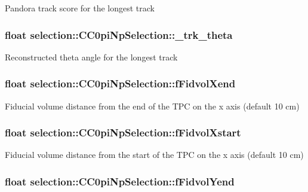 Pandora track score for the longest track \hypertarget{classselection_1_1CC0piNpSelection_a08cd38de74e9611829a3580a310c19f2}{
\subsubsection[{\-\_\-trk\-\_\-theta}]{\setlength{\rightskip}{0pt plus 5cm}float selection\-::\-C\-C0pi\-Np\-Selection\-::\-\_\-trk\-\_\-theta\hspace{0.3cm}{\ttfamily [private]}}}\label{classselection_1_1CC0piNpSelection_a08cd38de74e9611829a3580a310c19f2}
Reconstructed theta angle for the longest track \hypertarget{classselection_1_1CC0piNpSelection_a754589459e1f2d90a8ad853c68f864db}{
\subsubsection[{f\-Fidvol\-Xend}]{\setlength{\rightskip}{0pt plus 5cm}float selection\-::\-C\-C0pi\-Np\-Selection\-::f\-Fidvol\-Xend\hspace{0.3cm}{\ttfamily [private]}}}\label{classselection_1_1CC0piNpSelection_a754589459e1f2d90a8ad853c68f864db}
Fiducial volume distance from the end of the T\-P\-C on the x axis (default 10 cm) \hypertarget{classselection_1_1CC0piNpSelection_a783e7f9dcd42c083658870f7d23931da}{
\subsubsection[{f\-Fidvol\-Xstart}]{\setlength{\rightskip}{0pt plus 5cm}float selection\-::\-C\-C0pi\-Np\-Selection\-::f\-Fidvol\-Xstart\hspace{0.3cm}{\ttfamily [private]}}}\label{classselection_1_1CC0piNpSelection_a783e7f9dcd42c083658870f7d23931da}
Fiducial volume distance from the start of the T\-P\-C on the x axis (default 10 cm) \hypertarget{classselection_1_1CC0piNpSelection_a4732dc1091cb1881c741d57f999b5035}{
\subsubsection[{f\-Fidvol\-Yend}]{\setlength{\rightskip}{0pt plus 5cm}float selection\-::\-C\-C0pi\-Np\-Selection\-::f\-Fidvol\-Yend\hspace{0.3cm}{\ttfamily [private]}}}\label{classselection_1_1CC0piNpSelection_a4732dc1091cb1881c741d57f999b5035}
